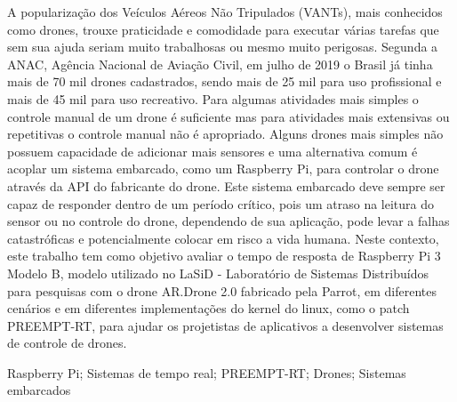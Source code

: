 \resumo
A popularização dos Veículos Aéreos Não Tripulados (VANTs), mais conhecidos como drones, trouxe praticidade e comodidade para executar várias tarefas que sem sua ajuda seriam muito trabalhosas ou mesmo muito perigosas. Segunda a ANAC, Agência Nacional de Aviação Civil, em julho de 2019 o Brasil já tinha mais de 70 mil drones cadastrados, sendo mais de 25 mil para uso profissional e mais de 45 mil para uso recreativo. Para algumas atividades mais simples o controle manual de um drone é suficiente mas para atividades mais extensivas ou repetitivas o controle manual não é apropriado. Alguns drones mais simples não possuem capacidade de adicionar mais sensores e uma alternativa comum é acoplar um sistema embarcado, como um Raspberry Pi, para controlar o drone através da API do fabricante do drone. Este sistema embarcado deve sempre ser capaz de responder dentro de um período crítico, pois um atraso na leitura do sensor ou no controle do drone, dependendo de sua aplicação, pode levar a falhas catastróficas e potencialmente colocar em risco a vida humana. Neste contexto, este trabalho tem como objetivo avaliar o tempo de resposta de Raspberry Pi 3 Modelo B, modelo utilizado no LaSiD - Laboratório de Sistemas Distribuídos para pesquisas com o drone AR.Drone 2.0 fabricado pela Parrot, em diferentes cenários e em diferentes implementações do kernel do linux, como o patch PREEMPT-RT, para ajudar os projetistas de aplicativos a desenvolver sistemas de controle de drones.

\begin{keywords}
Raspberry Pi; Sistemas de tempo real; PREEMPT-RT; Drones; Sistemas embarcados
\end{keywords}
